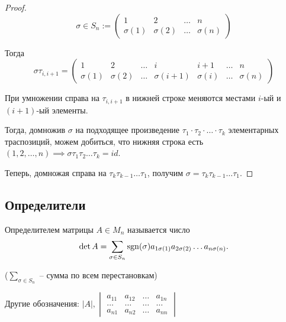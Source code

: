 \begin{proof}
    \begin{equation*}
        \sigma \in S_n :=
        \begin{pmatrix}
            1 & 2 & \dots & n \\
            \sigma (1) & \sigma (2) & \dots & \sigma (n)
        \end{pmatrix}
    \end{equation*}

    Тогда
    \begin{equation*}
        \sigma \tau_{i, i+1} = \begin{pmatrix}
            1 & 2 & \dots & i & i+1 & \dots & n \\
            \sigma (1) & \sigma (2) & \dots & \sigma(i+1) & \sigma(i) & \dots & \sigma (n)
        \end{pmatrix}
    \end{equation*}

    При умножении справа на $\tau_{i, i+1}$ в нижней строке меняются местами $i$-ый и $(i+1)$-ый элементы.

    Тогда, домножив $\sigma$ на подходящее произведение $\tau_1 \cdot \tau_2 \cdot \dots \cdot \tau_k$ элементарных траспозиций, можем добиться, что нижняя строка есть $(1, 2, \dots, n) \implies \sigma \tau_1 \tau_2 \dots \tau_k = id$.

    Теперь, домножая справа на $\tau_k \tau_{k-1} \dots \tau_1$, получим $\sigma = \tau_k \tau_{k-1} \dots \tau_1$.
\end{proof}

\subsection{Определители}

\begin{definition}
    Определителем матрицы $A \in M_n$ называется число
    \begin{equation*}
        \det A = \sum_{\sigma \in S_n} \operatorname{\mathop{\mathrm{sgn}}}(\sigma) a_{1\sigma(1)} a_{2 \sigma(2)} \dots a_{n\sigma(n)}
    .\end{equation*}

    ($\sum_{\sigma \in S_n}$ -- сумма по всем перестановкам)
\end{definition}

\bigskip
Другие обозначения: $|A|, \begin{vmatrix} a_{11} & a_{12} & \dots & a_{1n} \\ \dots & \dots & \dots & \dots \\ a_{n1} & a_{n2} & \dots & a_{nn} \end{vmatrix}$

